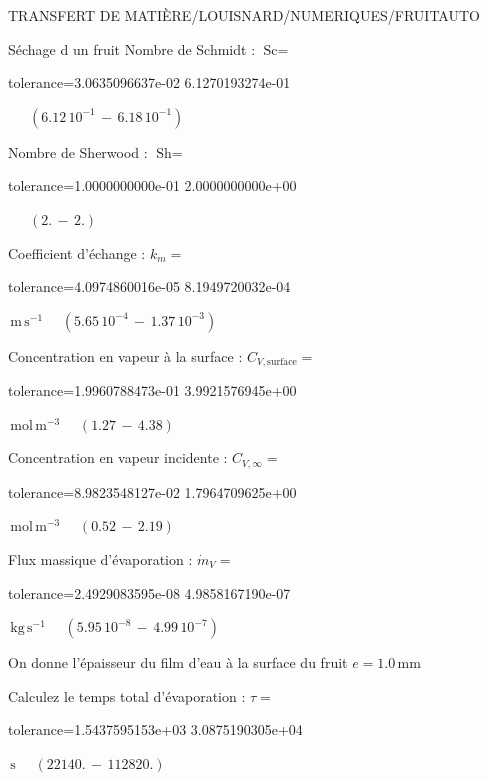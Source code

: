 \documentclass[12pt]{article}
\begin{document}
\begin{quiz}{TRANSFERT DE MATIÈRE/LOUISNARD/NUMERIQUES/FRUITAUTO}
\begin{cloze}{Séchage d un fruit}
Nombre de Schmidt : $\text{Sc} =  $
\begin{numerical}[points=1] 
\item[tolerance={3.0635096637e-02}] 6.1270193274e-01 
\end{numerical} 
 $\,$ 
 $ \quad ( 6.12 \, 10^{-1}  \, - \,  6.18 \, 10^{-1} ) $ 

Nombre de Sherwood : $\text{Sh} =  $
\begin{numerical}[points=2] 
\item[tolerance={1.0000000000e-01}] 2.0000000000e+00 
\end{numerical} 
 $\,$ 
 $ \quad (2. \, - \, 2.) $ 

Coefficient d'échange : $k_m =  $
\begin{numerical}[points=1] 
\item[tolerance={4.0974860016e-05}] 8.1949720032e-04 
\end{numerical} 
 $\,  \mathrm{m}\,  \mathrm{s}^{-1}$ 
 $ \quad ( 5.65 \, 10^{-4}  \, - \,  1.37 \, 10^{-3} ) $ 

Concentration en vapeur à la surface : $C_{V, \text{surface}} =  $
\begin{numerical}[points=2] 
\item[tolerance={1.9960788473e-01}] 3.9921576945e+00 
\end{numerical} 
 $\,  \mathrm{mol}\,  \mathrm{m}^{-3}$ 
 $ \quad (1.27 \, - \, 4.38) $ 

Concentration en vapeur incidente : $C_{V, \infty} =  $
\begin{numerical}[points=2] 
\item[tolerance={8.9823548127e-02}] 1.7964709625e+00 
\end{numerical} 
 $\,  \mathrm{mol}\,  \mathrm{m}^{-3}$ 
 $ \quad (0.52 \, - \, 2.19) $ 

Flux massique d'évaporation : $\dot{m}_V =  $
\begin{numerical}[points=1] 
\item[tolerance={2.4929083595e-08}] 4.9858167190e-07 
\end{numerical} 
 $\,  \mathrm{kg}\,  \mathrm{s}^{-1}$ 
 $ \quad ( 5.95 \, 10^{-8}  \, - \,  4.99 \, 10^{-7} ) $ 

 

On donne l'épaisseur du film d'eau à la surface du fruit $e = 1.0\,  \mathrm{mm} $

Calculez le temps total d'évaporation : $\tau =  $
\begin{numerical}[points=2] 
\item[tolerance={1.5437595153e+03}] 3.0875190305e+04 
\end{numerical} 
 $\,  \mathrm{s}$ 
 $ \quad (22140. \, - \, 112820.) $ 


\end{cloze}
\end{quiz}
\end{document}
